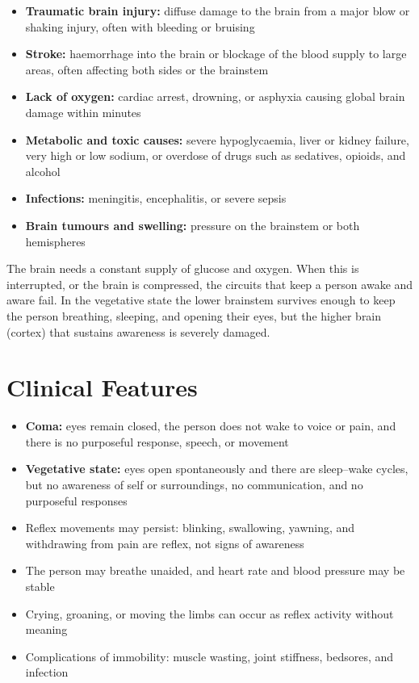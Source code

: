 \begin{itemize}
    \item \textbf{Traumatic brain injury:} diffuse damage to the brain from a major blow or shaking injury, often with bleeding or bruising
    \item \textbf{Stroke:} haemorrhage into the brain or blockage of the blood supply to large areas, often affecting both sides or the brainstem
    \item \textbf{Lack of oxygen:} cardiac arrest, drowning, or asphyxia causing global brain damage within minutes
    \item \textbf{Metabolic and toxic causes:} severe hypoglycaemia, liver or kidney failure, very high or low sodium, or overdose of drugs such as sedatives, opioids, and alcohol
    \item \textbf{Infections:} meningitis, encephalitis, or severe sepsis
    \item \textbf{Brain tumours and swelling:} pressure on the brainstem or both hemispheres
\end{itemize}

The brain needs a constant supply of glucose and oxygen. When this is interrupted, or the brain is compressed, the circuits that keep a person awake and aware fail. In the vegetative state the lower brainstem survives enough to keep the person breathing, sleeping, and opening their eyes, but the higher brain (cortex) that sustains awareness is severely damaged.

\section*{Clinical Features}
\begin{itemize}
    \item \textbf{Coma:} eyes remain closed, the person does not wake to voice or pain, and there is no purposeful response, speech, or movement
    \item \textbf{Vegetative state:} eyes open spontaneously and there are sleep--wake cycles, but no awareness of self or surroundings, no communication, and no purposeful responses
    \item Reflex movements may persist: blinking, swallowing, yawning, and withdrawing from pain are reflex, not signs of awareness
    \item The person may breathe unaided, and heart rate and blood pressure may be stable
    \item Crying, groaning, or moving the limbs can occur as reflex activity without meaning
    \item Complications of immobility: muscle wasting, joint stiffness, bedsores, and infection
\end{itemize}

